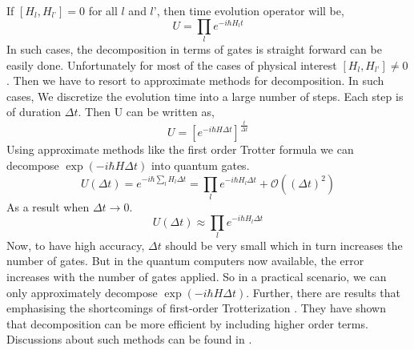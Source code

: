 \documentclass[12pt,a4paper]{report}
\begin{document}
If $[ H_{l}, H_{l’}] =0$ for all $l$ and $l’$, then time evolution operator will be,
\begin{equation}
U = \prod_{l} e^{-i \hbar H_{l} t} 
\end{equation}
In such cases, the decomposition in terms of gates is straight forward can be easily done. Unfortunately for most of the cases of physical interest $[ H_{l}, H_{l’}] \neq 0 $. 
Then we have to resort to approximate methods for decomposition. In such cases, We discretize the evolution time into a large number of steps. Each step is of duration $\Delta t$. Then U can be written as,
\begin{equation}
U = \left[e^{-i \hbar H\Delta t}\right]^{\frac{t}{\Delta t}}
\end{equation}
Using approximate methods like the first order Trotter formula we can decompose $\exp(-i\hbar H\Delta t)$ into quantum gates. 
\begin{equation}
U(\Delta t) = e^{-i\hbar\sum_{l} H_{l}\Delta t} = \prod_{l} e^{-i\hbar H_{l}\Delta t}+ \mathcal{O}((\Delta t)^{2})
\end{equation}
As a result when $\Delta t \rightarrow 0$.
\begin{equation}
U(\Delta t) \approx \prod_{l} e^{-i \hbar H_{l}\Delta t}
\end{equation}
Now, to have high accuracy, $\Delta t$ should be very small which in turn increases the number of gates. But in the quantum computers now available, the error increases with the number of gates applied. So in a practical scenario, we can only approximately decompose $\exp(-i\hbar H\Delta t)$. Further, there are results that emphasising the shortcomings of first-order Trotterization \cite{brown}\cite{clark}.  They have shown that decomposition can be more efficient by including higher order terms. Discussions about such methods can be found in \cite{nielsen}. 
\end{document}

